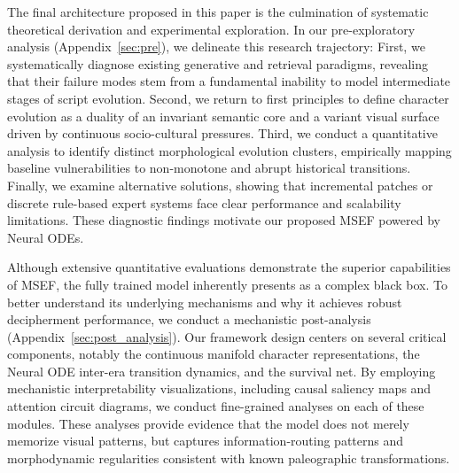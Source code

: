 \documentclass{article}
\begin{document}
The final architecture proposed in this paper is the culmination of systematic theoretical derivation and experimental exploration. In our pre-exploratory analysis (Appendix~\ref{sec:pre}), we delineate this research trajectory: First, we systematically diagnose existing generative and retrieval paradigms, revealing that their failure modes stem from a fundamental inability to model intermediate stages of script evolution. Second, we return to first principles to define character evolution as a duality of an invariant semantic core and a variant visual surface driven by continuous socio-cultural pressures. Third, we conduct a quantitative analysis to identify distinct morphological evolution clusters, empirically mapping baseline vulnerabilities to non-monotone and abrupt historical transitions. Finally, we examine alternative solutions, showing that incremental patches or discrete rule-based expert systems face clear performance and scalability limitations. These diagnostic findings motivate our proposed MSEF powered by Neural ODEs.

Although extensive quantitative evaluations demonstrate the superior capabilities of MSEF, the fully trained model inherently presents as a complex black box. To better understand its underlying mechanisms and why it achieves robust decipherment performance, we conduct a mechanistic post-analysis (Appendix~\ref{sec:post_analysis}). Our framework design centers on several critical components, notably the continuous manifold character representations, the Neural ODE inter-era transition dynamics, and the survival net. By employing mechanistic interpretability visualizations, including causal saliency maps and attention circuit diagrams, we conduct fine-grained analyses on each of these modules. These analyses provide evidence that the model does not merely memorize visual patterns, but captures information-routing patterns and morphodynamic regularities consistent with known paleographic transformations.
\end{document}
